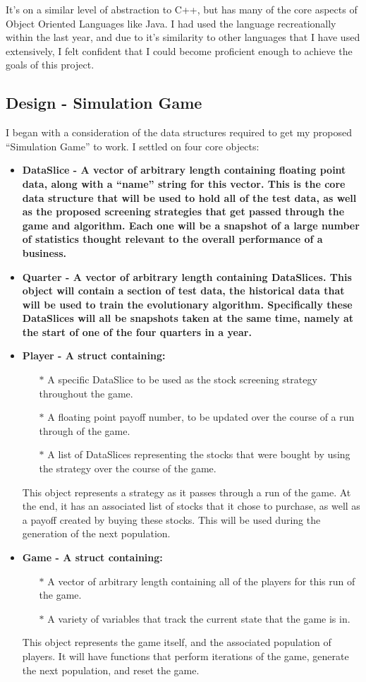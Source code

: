 It's on a similar level of abstraction to C++, but has many of the core aspects of Object Oriented Languages like Java. I had used the language recreationally within the last year, and due to it's similarity to other languages that I have used extensively, I felt confident that I could become proficient enough to achieve the goals of this project.

\subsection{Design - Simulation Game}
I began with a consideration of the data structures required to get my proposed ``Simulation Game'' to work. I settled on four core objects:
\begin{itemize}
    \item \bf DataSlice \rm - A vector of arbitrary length containing floating point data, along with a ``name'' string for this vector. This is the core data structure that will be used to hold all of the test data, as well as the proposed screening strategies that get passed through the game and algorithm. Each one will be a snapshot of a large number of statistics thought relevant to the overall performance of a business.
    \item \bf Quarter \rm - A vector of arbitrary length containing DataSlices. This object will contain a section of test data, the historical data that will be used to train the evolutionary algorithm. Specifically these DataSlices will all be snapshots taken at the same time, namely at the start of one of the four quarters in a year.
    \item \bf Player \rm - A struct containing:
    \begin{itemize}
        \item[$\ast$] A specific DataSlice to be used as the stock screening strategy throughout the game.
        \item[$\ast$] A floating point payoff number, to be updated over the course of a run through of the game.
        \item[$\ast$] A list of DataSlices representing the stocks that were bought by using the strategy over the course of the game.
    \end{itemize}
    This object represents a strategy as it passes through a run of the game. At the end, it has an associated list of stocks that it chose to purchase, as well as a payoff created by buying these stocks. This will be used during the generation of the next population.
    \item \bf Game \rm - A struct containing:
    \begin{itemize}
        \item[$\ast$] A vector of arbitrary length containing all of the players for this run of the game.
        \item[$\ast$] A variety of variables that track the current state that the game is in.
    \end{itemize}
        This object represents the game itself, and the associated population of players. It will have functions that perform iterations of the game, generate the next population, and reset the game.
\end{itemize}
